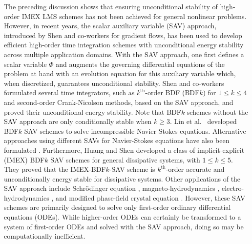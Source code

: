 \documentclass[review]{elsarticle}
\begin{document}
The preceding discussion shows that ensuring unconditional stability of high-order IMEX LMS schemes has not been achieved for general nonlinear problems. 
However, in recent years, the scalar auxiliary variable (SAV) approach, introduced by Shen and co-workers \cite{shen2018scalar,shen2019new,shen2018convergence} for gradient flows, has been used to develop efficient high-order time integration schemes with unconditional energy stability across multiple application domains.
With the SAV approach, one first defines a scalar variable $\Phi$ and augments the governing differential equations of the problem at hand with an evolution equation for this auxiliary variable which, when discretized, guarantees unconditional stability.
Shen and co-workers formulated several time integrators, such as $k^{\textrm{th}}$-order BDF (BDF$k$) for $1\le k \le 4$ and second-order Crank-Nicolson methods, based on the SAV approach, and proved their unconditional energy stability.
Note that BDF$k$ schemes without the SAV approach are only conditionally stable when $k\ge3$.
Lin et al.~\cite{lin2019numerical} developed BDF$k$ SAV schemes to solve incompressible Navier-Stokes equations.
Alternative approaches using different SAVs for Navier-Stokes equations have also been formulated \cite{li2020error, huang2021stability, li2022new, zhang2022unconditional}. 
Furthermore, Huang and Shen \cite{huang2022new} developed a class of implicit-explicit (IMEX) BDF$k$ SAV schemes for general dissipative systems, with $1\le k \le 5$.
They proved that the IMEX-BDF$k$-SAV scheme is $k^{\textrm{th}}$-order accurate and unconditionally energy stable for dissipative systems.
Other applications of the SAV approach include Schr{\"o}dinger equation \cite{deng2021second,poulain2022convergence}, magneto-hydrodynamics \cite{li2022stability}, electro-hydrodynamics \cite{he2023stability}, and modified phase-field crystal equation \cite{qi2023error}.
However, these SAV schemes are primarily designed to solve only first-order ordinary differential equations (ODEs).
While higher-order ODEs can certainly be transformed to a system of first-order ODEs and solved with the SAV approach, doing so may be computationally inefficient.
\end{document}
